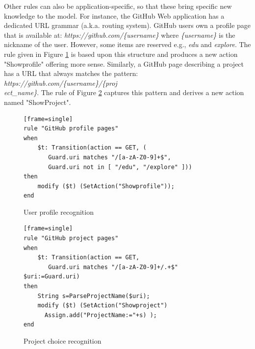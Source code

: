 Other rules can also be application-specific, so that these bring
specific new knowledge to the model. For instance, the GitHub Web
application has a dedicated URL grammar (a.k.a. routing system).
GitHub users own a profile page that is available at:
\emph{https://github.com/\{username\}} where \emph{\{username\}}
is the nickname of the user. However, some items are reserved
e.g., \textit{edu} and \textit{explore}. The rule given in Figure
\ref{fig:rule:gh-profile} is based upon this structure and
produces a new action "Showprofile" offering more sense.
Similarly, a GitHub page describing a project has a URL that
always matches the pattern:
\emph{https://github.com/\{username\}/\{proj}\\
\emph{ect\_name\}}. The rule of Figure \ref{fig:rule:gh-project}
captures this pattern and derives a new action named "ShowProject".

\begin{figure}[ht]
\begin{center}
\begin{scriptsize}
\begin{verbatim}[frame=single]
rule "GitHub profile pages"
when
    $t: Transition(action == GET, (
       Guard.uri matches "/[a-zA-Z0-9]+$",
       Guard.uri not in [ "/edu", "/explore" ]))
then
    modify ($t) (SetAction("Showprofile"));
end
\end{verbatim}
\end{scriptsize}
\end{center}

\caption {User profile recognition} \label{fig:rule:gh-profile}
\end{figure}


\begin{figure}[ht]
\begin{center}
\begin{scriptsize}
\begin{verbatim}[frame=single]
rule "GitHub project pages"
when
    $t: Transition(action == GET,
       Guard.uri matches "/[a-zA-Z0-9]+/.+$" $uri:=Guard.uri)
then
    String s=ParseProjectName($uri);
    modify ($t) (SetAction("Showproject")
      Assign.add("ProjectName:="+s) );
end
\end{verbatim}
\end{scriptsize}
\end{center}

\caption {Project choice recognition} \label{fig:rule:gh-project}
\end{figure}

